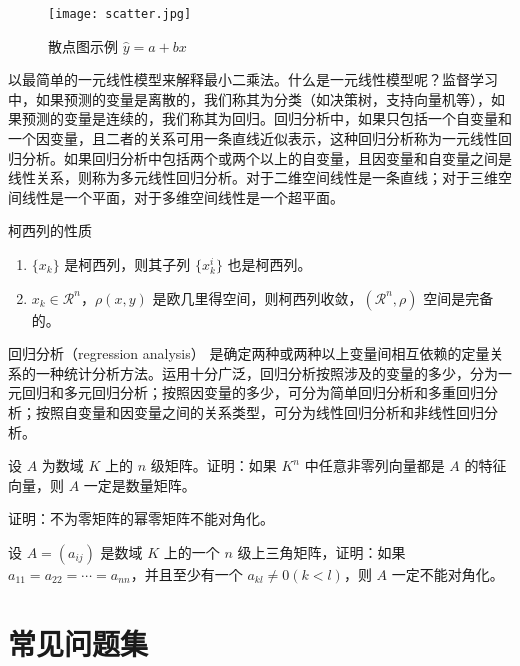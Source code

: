 \documentclass[lang=cn,newtx,10pt,scheme=chinese]{elegantbook}
\begin{document}
\begin{figure}[htbp]
  \centering
  \texttt{[image: scatter.jpg]}
  \caption{散点图示例 $\hat{y}=a+bx$ \label{fig:scatter}}
\end{figure}

以最简单的一元线性模型来解释最小二乘法。什么是一元线性模型呢？监督学习中，如果预测的变量是离散的，我们称其为分类（如决策树，支持向量机等），如果预测的变量是连续的，我们称其为回归。回归分析中，如果只包括一个自变量和一个因变量，且二者的关系可用一条直线近似表示，这种回归分析称为一元线性回归分析。如果回归分析中包括两个或两个以上的自变量，且因变量和自变量之间是线性关系，则称为多元线性回归分析。对于二维空间线性是一条直线；对于三维空间线性是一个平面，对于多维空间线性是一个超平面。

\begin{property}\label{property:cauchy}
柯西列的性质
\begin{enumerate}
\item $\{x_k\}$ 是柯西列，则其子列 $\{x_k^i\}$ 也是柯西列。
\item $x_k\in \mathcal{R}^n$，$\rho(x,y)$ 是欧几里得空间，则柯西列收敛，$(\mathcal{R}^n,\rho)$ 空间是完备的。
\end{enumerate}
\end{property}

\begin{conclusion}
回归分析（regression analysis） 是确定两种或两种以上变量间相互依赖的定量关系的一种统计分析方法。运用十分广泛，回归分析按照涉及的变量的多少，分为一元回归和多元回归分析；按照因变量的多少，可分为简单回归分析和多重回归分析；按照自变量和因变量之间的关系类型，可分为线性回归分析和非线性回归分析。
\end{conclusion}

\begin{problemset}
\item 设 $A$ 为数域 $K$ 上的 $n$ 级矩阵。证明：如果 $K^n$ 中任意非零列向量都是 $A$ 的特征向量，则 $A$ 一定是数量矩阵。
\item 证明：不为零矩阵的幂零矩阵不能对角化。
\item 设 $A = (a_{ij})$ 是数域 $K$ 上的一个 $n$ 级上三角矩阵，证明：如果 $a_{11} = a_{22} = \cdots = a_{nn}$，并且至少有一个 $a_{kl} \not = 0 (k < l)$，则 $A$ 一定不能对角化。
\end{problemset}

\chapter{常见问题集}
\end{document}
